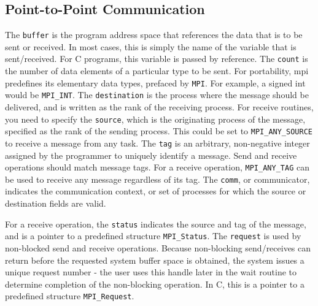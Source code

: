 \documentclass[10pt]{article}
\begin{document}
\begin{flushleft}
\subsection{Point-to-Point Communication}

The {\tt buffer} is the program address space that references the data that is to be sent or received. In most cases, this is simply the name of the variable that is sent/received. For C programs, this variable is passed by reference. The {\tt count} is the number of data elements of a particular type to be sent. For portability, \gls{mpi} predefines its elementary data types, prefaced by {\tt MPI}. For example, a signed int would be {\tt MPI\_INT}. The {\tt destination} is the process where the message should be delivered, and is written as the rank of the receiving process. For receive routines, you need to specify the {\tt source}, which is the originating process of the message, specified as the rank of the sending process. This could be set to {\tt MPI\_ANY\_SOURCE} to receive a message from any task. The {\tt tag} is an arbitrary, non-negative integer assigned by the programmer to uniquely identify a message. Send and receive operations should match message tags. For a receive operation, {\tt MPI\_ANY\_TAG} can be used to receive any message regardless of its tag. The {\tt comm}, or communicator, indicates the communication context, or set of processes for which the source or destination fields are valid. 

For a receive operation, the {\tt status} indicates the source and tag of the message, and is a pointer to a predefined structure {\tt MPI\_Status}. The {\tt request} is used by non-blocked send and receive operations. Because non-blocking send/receives can return before the requested system buffer space is obtained, the system issues a unique request number - the user uses this handle later in the wait routine to determine completion of the non-blocking operation. In C, this is a pointer to a predefined structure {\tt MPI\_Request}. 


\end{flushleft}
\end{document}
